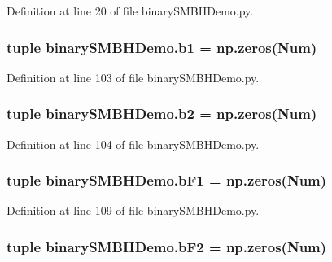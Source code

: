 Definition at line 20 of file binary\-S\-M\-B\-H\-Demo.\-py.

\hypertarget{namespacebinary_s_m_b_h_demo_a0af6084664694df5039ec3df3d668af2}{
\subsubsection[{b1}]{\setlength{\rightskip}{0pt plus 5cm}tuple binary\-S\-M\-B\-H\-Demo.\-b1 = np.\-zeros({\bf Num})}}\label{namespacebinary_s_m_b_h_demo_a0af6084664694df5039ec3df3d668af2}


Definition at line 103 of file binary\-S\-M\-B\-H\-Demo.\-py.

\hypertarget{namespacebinary_s_m_b_h_demo_a62cb2cf629c3ab5e8a7f7852c6aa257b}{
\subsubsection[{b2}]{\setlength{\rightskip}{0pt plus 5cm}tuple binary\-S\-M\-B\-H\-Demo.\-b2 = np.\-zeros({\bf Num})}}\label{namespacebinary_s_m_b_h_demo_a62cb2cf629c3ab5e8a7f7852c6aa257b}


Definition at line 104 of file binary\-S\-M\-B\-H\-Demo.\-py.

\hypertarget{namespacebinary_s_m_b_h_demo_a89dd804276d1e3c5b4911a55f2488a8f}{
\subsubsection[{b\-F1}]{\setlength{\rightskip}{0pt plus 5cm}tuple binary\-S\-M\-B\-H\-Demo.\-b\-F1 = np.\-zeros({\bf Num})}}\label{namespacebinary_s_m_b_h_demo_a89dd804276d1e3c5b4911a55f2488a8f}


Definition at line 109 of file binary\-S\-M\-B\-H\-Demo.\-py.

\hypertarget{namespacebinary_s_m_b_h_demo_ad791db1c35e09782bcb026c48d76adc6}{
\subsubsection[{b\-F2}]{\setlength{\rightskip}{0pt plus 5cm}tuple binary\-S\-M\-B\-H\-Demo.\-b\-F2 = np.\-zeros({\bf Num})}}\label{namespacebinary_s_m_b_h_demo_ad791db1c35e09782bcb026c48d76adc6}


